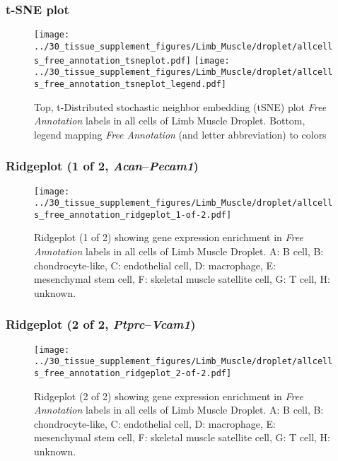\subsubsection{t-SNE plot}
\begin{figure}[h]
\centering
\texttt{[image: ../30\_tissue\_supplement\_figures/Limb\_Muscle/droplet/allcells\_free\_annotation\_tsneplot.pdf]}
\texttt{[image: ../30\_tissue\_supplement\_figures/Limb\_Muscle/droplet/allcells\_free\_annotation\_tsneplot\_legend.pdf]}
\caption{Top, t-Distributed stochastic neighbor embedding (tSNE) plot  \emph{Free Annotation} labels in all cells of Limb Muscle Droplet. Bottom, legend mapping \emph{Free Annotation} (and letter abbreviation) to colors}
\end{figure}


\clearpage

\subsubsection{Ridgeplot (1 of 2, \emph{Acan}--\emph{Pecam1})}
\begin{figure}[h]
\centering
\texttt{[image: ../30\_tissue\_supplement\_figures/Limb\_Muscle/droplet/allcells\_free\_annotation\_ridgeplot\_1-of-2.pdf]}

\caption{ Ridgeplot (1 of 2)  showing gene expression enrichment in \emph{Free Annotation} labels in all cells of Limb Muscle Droplet. A: B cell, B: chondrocyte-like, C: endothelial cell, D: macrophage, E: mesenchymal stem cell, F: skeletal muscle satellite cell, G: T cell, H: unknown.}
\end{figure}


\clearpage

\subsubsection{Ridgeplot (2 of 2, \emph{Ptprc}--\emph{Vcam1})}
\begin{figure}[h]
\centering
\texttt{[image: ../30\_tissue\_supplement\_figures/Limb\_Muscle/droplet/allcells\_free\_annotation\_ridgeplot\_2-of-2.pdf]}

\caption{ Ridgeplot (2 of 2)  showing gene expression enrichment in \emph{Free Annotation} labels in all cells of Limb Muscle Droplet. A: B cell, B: chondrocyte-like, C: endothelial cell, D: macrophage, E: mesenchymal stem cell, F: skeletal muscle satellite cell, G: T cell, H: unknown.}
\end{figure}


